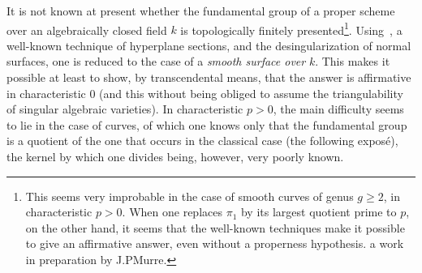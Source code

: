 \begin{remark}
\label{IX.5.7}
It is not known at present whether the fundamental group of a proper
scheme over an algebraically closed field $k$ is topologically
finitely presented\footnote{This seems very improbable in the case of
smooth curves of genus $g\geq 2$, in characteristic $p>0$. When one
replaces $\pi_1$ by its largest quotient prime to $p$, on the other
hand, it seems that the well-known techniques make it possible to
give an affirmative answer, even without a properness hypothesis.
\Cf a work in preparation by J.P\ptbl Murre.}. Using~, a
well-known technique of hyperplane sections, and the desingularization
of normal surfaces, one is reduced to the case of a \emph{smooth
surface over} $k$. This makes it possible at least to show, by
transcendental means, that the answer is affirmative in
characteristic $0$ (and this without being obliged to assume the
triangulability of singular algebraic varieties). In characteristic
$p>0$, the main difficulty seems to lie in the case of curves, of
which one knows only that the fundamental group is a quotient of the
one that occurs in the classical case (\cf the following exposé), the
kernel by which one divides being, however, very poorly known.
\end{remark}

